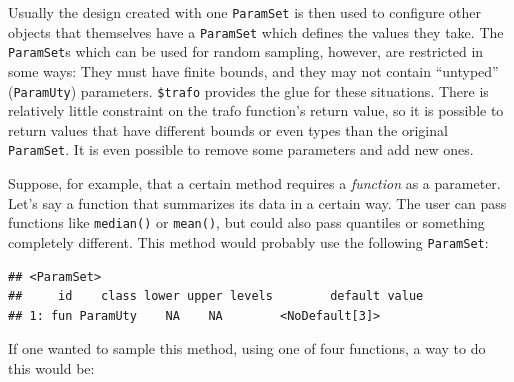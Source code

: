 \documentclass[]{scrbook}
\newenvironment{Shaded}{\begin{snugshade}}{\end{snugshade}}
\newcommand{\ControlFlowTok}[1]{\textcolor[rgb]{0.13,0.29,0.53}{\textbf{#1}}}
\newcommand{\DataTypeTok}[1]{\textcolor[rgb]{0.13,0.29,0.53}{#1}}
\newcommand{\DecValTok}[1]{\textcolor[rgb]{0.00,0.00,0.81}{#1}}
\newcommand{\KeywordTok}[1]{\textcolor[rgb]{0.13,0.29,0.53}{\textbf{#1}}}
\newcommand{\NormalTok}[1]{#1}
\newcommand{\OperatorTok}[1]{\textcolor[rgb]{0.81,0.36,0.00}{\textbf{#1}}}
\newcommand{\StringTok}[1]{\textcolor[rgb]{0.31,0.60,0.02}{#1}}
\renewenvironment{Shaded} {\begin{snugshade}\small} {\end{snugshade}}
\begin{document}
Usually the design created with one \texttt{ParamSet} is then used to configure other objects that themselves have a \texttt{ParamSet} which defines the values they take.
The \texttt{ParamSet}s which can be used for random sampling, however, are restricted in some ways:
They must have finite bounds, and they may not contain ``untyped'' (\texttt{ParamUty}) parameters.
\texttt{\$trafo} provides the glue for these situations.
There is relatively little constraint on the trafo function's return value, so it is possible to return values that have different bounds or even types than the original \texttt{ParamSet}.
It is even possible to remove some parameters and add new ones.

Suppose, for example, that a certain method requires a \emph{function} as a parameter.
Let's say a function that summarizes its data in a certain way.
The user can pass functions like \texttt{median()} or \texttt{mean()}, but could also pass quantiles or something completely different.
This method would probably use the following \texttt{ParamSet}:

\begin{Shaded}
\end{Shaded}

\begin{verbatim}
## <ParamSet>
##     id    class lower upper levels        default value
## 1: fun ParamUty    NA    NA        <NoDefault[3]>
\end{verbatim}

If one wanted to sample this method, using one of four functions, a way to do this would be:
\end{document}
